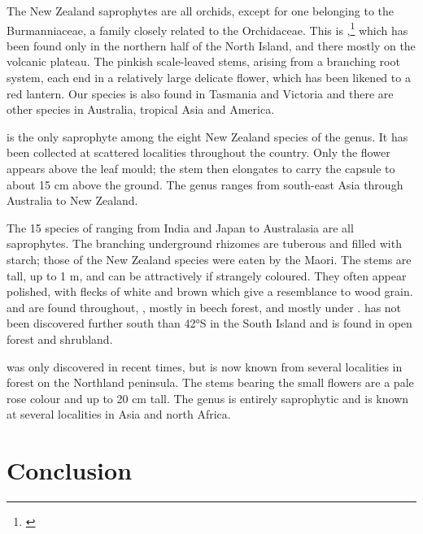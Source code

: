 The New Zealand saprophytes are all orchids, except for one belonging to the Burmanniaceae, a family closely related to the Orchidaceae.
This is ,\footnote{\cite{campbell1968investigation}} which has been found only in the northern half of the North Island, and there mostly on the volcanic plateau.
The pinkish scale-leaved stems, arising from a branching root system, each end in a relatively large delicate flower, which has been likened to a red lantern.
Our species is also found in Tasmania and Victoria and there are other species in Australia, tropical Asia and America.

 is the only saprophyte among the eight New Zealand species of the genus.
It has been collected at scattered localities throughout the country.
Only the flower appears above the leaf mould; the stem then elongates to carry the capsule to about 15 cm above the ground.
The genus ranges from south-east Asia through Australia to New Zealand.

The 15 species of  ranging from India and Japan to Australasia are all saprophytes.
The branching underground rhizomes are tuberous and filled with starch; those of the New Zealand species were eaten by the Maori.
The stems are tall, up to 1 m, and can be attractively if strangely coloured.
They often appear polished, with flecks of white and brown which give a resemblance to wood grain.  and  are found throughout, , mostly in beech forest, and  mostly under .  has not been discovered further south than 42°S in the South Island and is found in open forest and shrubland.

 was only discovered in recent times, but is now known from several localities in  forest on the Northland peninsula.
The stems bearing the small flowers are a pale rose colour and up to 20 cm tall.
The genus is entirely saprophytic and is known at several localities in Asia and north Africa.

\section{Conclusion}

